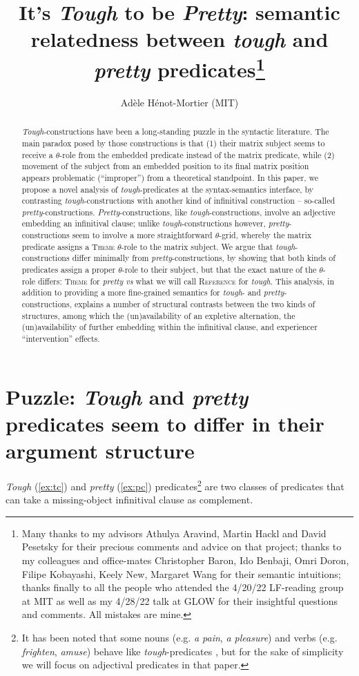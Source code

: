 \documentclass[11pt]{article}
\title{It's \textit{Tough} to be \textit{Pretty}: semantic relatedness between \textit{tough} and \textit{pretty} predicates\footnote{Many thanks to my advisors Athulya Aravind, Martin Hackl and David Pesetsky for their precious comments and advice on that project; thanks to my colleagues and office-mates Christopher Baron, Ido Benbaji, Omri Doron, Filipe Kobayashi, Keely New, Margaret Wang for their semantic intuitions; thanks finally to all the people who attended the 4/20/22 LF-reading group at MIT as well as my 4/28/22 talk at GLOW for their insightful questions and comments. All mistakes are mine.}}
\author{Adèle Hénot-Mortier (MIT)}
\let\ACMmaketitle=\maketitle
\renewcommand{\maketitle}{\begingroup\let\footnote=\thanks \ACMmaketitle\endgroup}
\begin{document}
\sloppy
\maketitle

\begin{abstract}
	\textit{Tough}-constructions have been a long-standing puzzle in the syntactic literature. The main paradox posed by those constructions is that (1) their matrix subject seems to receive a $\theta$-role from the embedded predicate instead of the matrix predicate, while (2) movement of the subject from an embedded position to its final matrix position appears problematic (``improper'') from a theoretical standpoint. In this paper, we propose a novel analysis of \textit{tough}-predicates at the syntax-semantics interface, by contrasting \textit{tough}-constructions with another kind of infinitival construction -- so-called \textit{pretty}-constructions. \textit{Pretty}-constructions, like \textit{tough}-constructions, involve an adjective embedding an infinitival clause; unlike \textit{tough}-constructions however, \textit{pretty}-constructions seem to involve a more straightforward $\theta$-grid, whereby the matrix predicate assigns a \textsc{Theme} $\theta$-role to the matrix subject. We argue that \textit{tough}-constructions differ minimally from \textit{pretty}-constructions, by showing that both kinds of predicates assign a proper $\theta$-role to their subject, but that the exact nature of the $\theta$-role differs: \textsc{Theme} for \textit{pretty} \textit{vs} what we will call \textsc{Reference} for \textit{tough}. This analysis, in addition to providing a more fine-grained semantics for \textit{tough}- and \textit{pretty}- constructions, explains a number of structural contrasts between the two kinds of structures, among which the (un)availability of an expletive alternation, the (un)availability of further embedding within the infinitival clause, and experiencer ``intervention'' effects.
\end{abstract}
\newpage
\tableofcontents
\newpage
\section{Puzzle: \textit{Tough} and \textit{pretty} predicates seem to differ in their argument structure}\label{sec:puzzle}
\textit{Tough} (\ref{ex:tc}) and \textit{pretty} (\ref{ex:pc}) predicates\footnote{It has been noted that some nouns (e.g. \textit{a pain}, \textit{a pleasure}) and verbs (e.g. \textit{frighten}, \textit{amuse}) behave like \textit{tough}-predicates \cite{Lasnik1974,Pesetsky1987, Gluckman2019}, but for the sake of simplicity we will focus on adjectival predicates in that paper.} are two classes of predicates that can take a missing-object infinitival clause as complement.
\begin{exe}
	\ex 
	\begin{xlist}
		\label{ex:tc}
		\label{ex:pc} 
	\end{xlist}\label{ex:tc-pc}
\end{exe}
\end{document}
